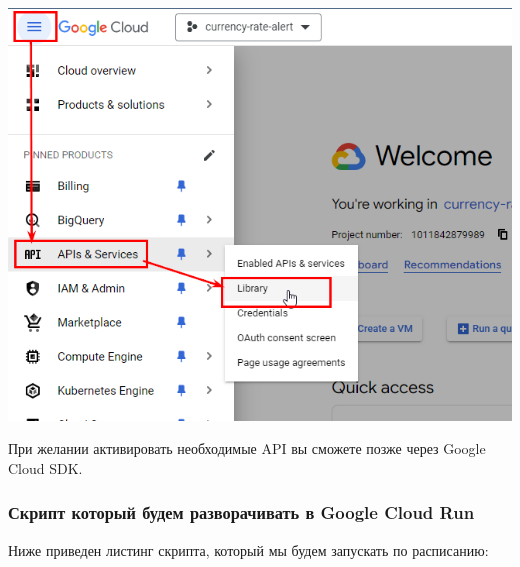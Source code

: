 \documentclass[
]{book}
\begin{document}
\includegraphics{img/9-1.png}

При желании активировать необходимые API вы сможете позже через Google Cloud SDK.

\subsubsection{Скрипт который будем разворачивать в Google Cloud Run}\label{ux441ux43aux440ux438ux43fux442-ux43aux43eux442ux43eux440ux44bux439-ux431ux443ux434ux435ux43c-ux440ux430ux437ux432ux43eux440ux430ux447ux438ux432ux430ux442ux44c-ux432-google-cloud-run}

Ниже приведен листинг скрипта, который мы будем запускать по расписанию:
\end{document}
